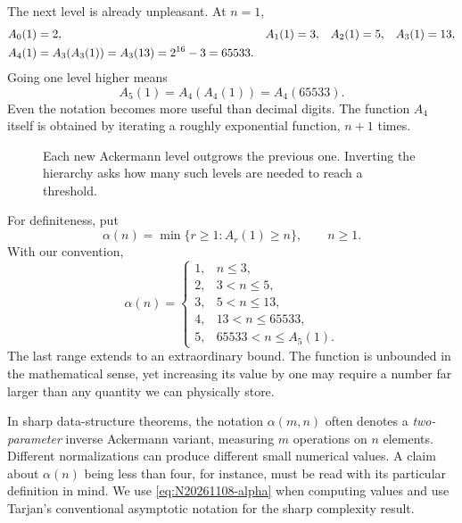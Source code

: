 The next level is already unpleasant. At \(n=1\),
\begin{align}
 A_0(1)&=2,&A_1(1)&=3,&A_2(1)&=5,&A_3(1)&=13,\notag\\
 A_4(1)&=A_3(A_3(1))
       =A_3(13)=2^{16}-3=65533.
 \label{eq:N20261108-values}
\end{align}
Going one level higher means
\[
 A_5(1)=A_4(A_4(1))=A_4(65533).
\]
Even the notation becomes more useful than decimal digits. The function \(A_4\) itself is obtained by iterating a roughly exponential function, \(n+1\) times.

\begin{figure}[htbp]
\centering
{}
\caption{Each new Ackermann level outgrows the previous one. Inverting the hierarchy asks how many such levels are needed to reach a threshold.}
\label{fig:N20261108-hierarchy}
\end{figure}

For definiteness, put
\begin{equation}
 \alpha(n)=\min\{r\geq1:A_r(1)\geq n\},
 \qquad n\geq1.
 \label{eq:N20261108-alpha}
\end{equation}
With our convention,
\[
 \alpha(n)=
 \begin{cases}
 1,&n\leq3,\\
 2,&3<n\leq5,\\
 3,&5<n\leq13,\\
 4,&13<n\leq65533,\\
 5,&65533<n\leq A_5(1).
 \end{cases}
\]
The last range extends to an extraordinary bound. The function is unbounded in the mathematical sense, yet increasing its value by one may require a number far larger than any quantity we can physically store.

In sharp data-structure theorems, the notation \(\alpha(m,n)\) often denotes a \emph{two-parameter} inverse Ackermann variant, measuring \(m\) operations on \(n\) elements. Different normalizations can produce different small numerical values. A claim about \(\alpha(n)\) being less than four, for instance, must be read with its particular definition in mind. We use \eqref{eq:N20261108-alpha} when computing values and use Tarjan's conventional asymptotic notation for the sharp complexity result.


